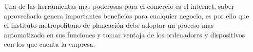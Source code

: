 Una de las herramientas mas poderosas para el comercio es el internet, saber aprovecharlo genera importantes beneficios para cualquier negocio, es por ello que el instituto metropolitano de planeación debe adoptar un proceso mas automatizado en sus funciones y tomar ventaja de los ordenadores y dispositivos con los que cuenta la empresa.